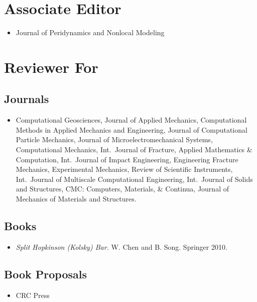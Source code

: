 \section*{Associate  Editor}

\begin{itemize}
    \item Journal of Peridynamics and Nonlocal Modeling
\end{itemize}

\section*{Reviewer For}

\subsection*{Journals}

\begin{itemize}
    \item Computational Geosciences, Journal of Applied Mechanics, Computational Methods in Applied Mechanics and Engineering, Journal of Computational Particle Mechanics, Journal of Microelectromechanical Systems, Computational Mechanics, Int.~Journal of Fracture, Applied Mathematics \& Computation, Int.~Journal of Impact Engineering, Engineering Fracture Mechanics, Experimental Mechanics,  Review of Scientific Instruments, Int.~Journal of Multiscale Computational Engineering, Int.~Journal of Solids and Structures, CMC: Computers, Materials, \& Continua, Journal of Mechanics of Materials and Structures.
\end{itemize}

\subsection*{Books}

\begin{itemize}
    \item {\it Split Hopkinson (Kolsky) Bar.}  W. Chen and B. Song.  Springer 2010.
\end{itemize}

\subsection*{Book Proposals}

\begin{itemize}
    \item CRC Press
\end{itemize}


